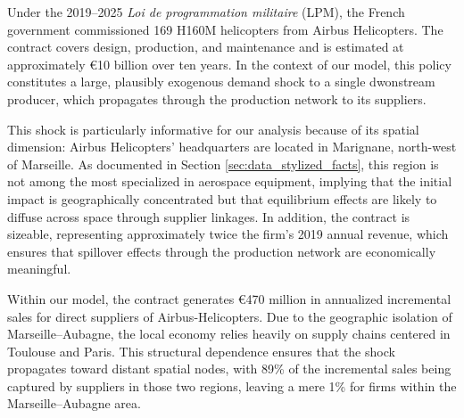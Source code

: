 Under the 2019–2025 \textit{Loi de programmation militaire} (LPM), the French government commissioned 169 H160M helicopters from Airbus Helicopters. The contract covers design, production, and maintenance and is estimated at approximately €10 billion over ten years. In the context of our model, this policy constitutes a large, plausibly exogenous demand shock to a single dwonstream producer, which propagates through the production network to its suppliers.

This shock is particularly informative for our analysis because of its spatial dimension: Airbus Helicopters’ headquarters are located in Marignane, north-west of Marseille. As documented in Section \ref{sec:data_stylized_facts}, this region is not among the most specialized in aerospace equipment, implying that the initial impact is geographically concentrated but that equilibrium effects are likely to diffuse across space through supplier linkages. In addition, the contract is sizeable, representing approximately twice the firm’s 2019 annual revenue, which ensures that spillover effects through the production network are economically meaningful.
 

Within our model, the contract generates €470 million in annualized incremental sales for direct suppliers of Airbus-Helicopters.  Due to the geographic isolation of Marseille--Aubagne, the local economy relies heavily on supply chains centered in Toulouse and Paris. This structural dependence ensures that the shock propagates toward distant spatial nodes, with 89\% of the incremental sales being captured by suppliers in those two regions, leaving a mere 1\% for firms within the Marseille--Aubagne area. 

